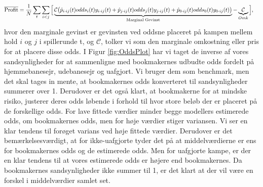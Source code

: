 \documentclass[11pt,a4paper]{article}
\begin{document}
\begin{align}
    \overline{\text{Profit}}&= \frac{1}{N}\sum_t\sum_{i<j}\Big{[} \underbrace{\mathcal{C}\big{(}\hat{p}_{i\cdot ij}(t)odds_i(t)y_{i\cdot ij}(t)+\hat{p}_{j\cdot ij}(t)odds_j(t)y_{j\cdot ij}(t)+\hat{p}_{0\cdot ij}(t)odds_0(t)y_{0\cdot ij}(t)\big{)}}_{\text{Marginal Gevinst}} -\underbrace{\mathcal{C}}_{Omk}\Big{]},\label{func:Profit}
\end{align}
hvor den marginale gevinst er gevinsten ved oddsne placeret på kampen mellem hold $i$ og $j$ i spillerunde t, og $\mathcal{C}$, tolker vi som den marginale omkostning eller pris for at placere disse odds. I Figur \ref{fig:OddsPlot} har vi taget de inverse af vores sandsynligheder for at sammenligne med bookmakernes udbudte odds fordelt på hjemmebanesejr, udebanesejr og uafgjort. Vi bruger dem som benchmark, men det skal tages in mente, at bookmakernes odds konverteret til sandsynligheder summerer over 1. Derudover er det også klart, at bookmakerne for at mindske risiko, justerer deres odds løbende i forhold til hvor store beløb der er placeret på de forskellige odds. For lave fittede værdier minder begge modellers estimerede odds, om bookmakernes odds, men for høje værdier stiger variansen. Vi ser en klar tendens til forøget varians ved høje fittede værdier. Derudover er det bemærkelsesværdigt, at for ikke-uafgjorte tyder det på at middelværdierne er ens for bookmakernes odds og de estimerede odds. Men for uafgjorte kampe, er der en klar tendens til at vores estimerede odds er højere end bookmakernes. Da bookmakernes sandsynligheder ikke summer til 1, er det klart at der vil være en forskel i middelværdier samlet set.  
\end{document}
